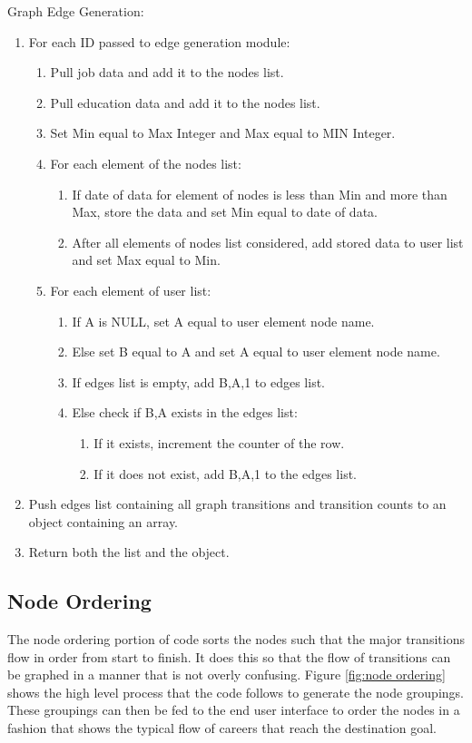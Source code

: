 \begin{description}
    \item[Graph Edge Generation:]
\end{description}
\begin{enumerate}
  \item For each ID passed to edge generation module:
  \begin{enumerate}
    \item Pull job data and add it to the nodes list.
    \item Pull education data and add it to the nodes list.
    \item Set Min equal to Max Integer and Max equal to MIN Integer.
    \item For each element of the nodes list:
    \begin{enumerate}
      \item If date of data for element of nodes is less than Min and more than
      Max, store the data and set Min equal to date of data.
      \item After all elements of nodes list considered, add stored data
      to user list and set Max equal to Min.
  	\end{enumerate}
  	\item For each element of user list:
  	\begin{enumerate}
  	  \item If A is NULL, set A equal to user element node name.
  	  \item Else set B equal to A and set A equal to user element node name.
  	  \item If edges list is empty, add B,A,1 to edges list.
  	  \item Else check if B,A exists in the edges list:
  	  \begin{enumerate}
  	    \item If it exists, increment the counter of the row.
  	    \item If it does not exist, add B,A,1 to the edges list.
  	  \end{enumerate}
  	\end{enumerate}
  \end{enumerate}
  \item Push edges list containing all graph transitions and transition
  counts to an object containing an array.
  \item Return both the list and the object.
\end{enumerate}

\subsection{Node Ordering}
The node ordering portion of code sorts the nodes such that the major
transitions flow in order from start to finish. It does this so that the flow
of transitions can be graphed in a manner that is not overly confusing.  Figure
\ref{fig:node ordering} shows the high level process that the code follows
to generate the node groupings.  These groupings can then be fed to the end user
interface to order the nodes in a fashion that shows the typical flow of careers
that reach the destination goal.

